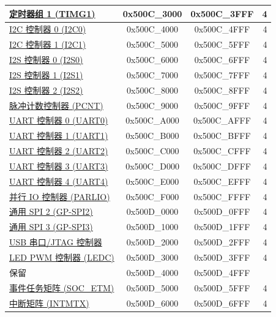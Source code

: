 \begin{ThreePartTable}
\begin{longtable}[c]{ |p{7cm}|c|c|r| }
\hyperref[mod:timg]{定时器组 1 (TIMG1)}        & 0x500C\_3000 & 0x500C\_3FFF &   4 \\\hline
\hyperref[mod:i2c]{I2C 控制器 0 (I2C0)}        & 0x500C\_4000 & 0x500C\_4FFF &   4 \\\hline
\hyperref[mod:i2c]{I2C 控制器 1 (I2C1)}        & 0x500C\_5000 & 0x500C\_5FFF &   4 \\\hline
\hyperref[mod:i2s]{I2S 控制器 0 (I2S0)}        & 0x500C\_6000 & 0x500C\_6FFF &   4 \\\hline
\hyperref[mod:i2s]{I2S 控制器 1 (I2S1)}        & 0x500C\_7000 & 0x500C\_7FFF &   4 \\\hline
\hyperref[mod:i2c]{I2S 控制器 2 (I2S2)}        & 0x500C\_8000 & 0x500C\_8FFF &   4 \\\hline
\hyperref[mod:pcnt]{脉冲计数控制器 (PCNT)} & 0x500C\_9000 & 0x500C\_9FFF &   4 \\\hline
\hyperref[mod:uart]{UART 控制器 0 (UART0)}    & 0x500C\_A000 & 0x500C\_AFFF &   4 \\\hline
\hyperref[mod:uart]{UART 控制器 1 (UART1)}    & 0x500C\_B000 & 0x500C\_BFFF &   4 \\\hline
\hyperref[mod:uart]{UART 控制器 2 (UART2)}     & 0x500C\_C000 & 0x500C\_CFFF &   4 \\\hline
\hyperref[mod:uart]{UART 控制器 3 (UART3)}     & 0x500C\_D000 & 0x500C\_DFFF &   4 \\\hline
\hyperref[mod:uart]{UART 控制器 4 (UART4)}     & 0x500C\_E000 & 0x500C\_EFFF &   4 \\\hline
\hyperref[mod:parlio]{并行 IO 控制器 (PARLIO)}       & 0x500C\_F000 & 0x500C\_FFFF &   4 \\\hline
\hyperref[mod:spi]{通用 SPI 2 (GP-SPI2)} & 0x500D\_0000 & 0x500D\_0FFF &   4 \\\hline
\hyperref[mod:spi]{通用 SPI 3 (GP-SPI3)} & 0x500D\_1000 & 0x500D\_1FFF &   4 \\\hline
\hyperref[mod:usbserialjtag]{USB 串口/JTAG 控制器}       & 0x500D\_2000 & 0x500D\_2FFF &   4 \\\hline
\hyperref[mod:ledpwm]{LED PWM 控制器 (LEDC)}  & 0x500D\_3000 & 0x500D\_3FFF &   4 \\\hline
\rowcolor{gray!25}  保留                      & 0x500D\_4000 & 0x500D\_4FFF &     \\\hline
\hyperref[mod:evntaskmatrix]{事件任务矩阵 (SOC\_ETM)}       & 0x500D\_5000 & 0x500D\_5FFF &   4 \\\hline
\hyperref[mod:intmtrx]{中断矩阵 (INTMTX)} & 0x500D\_6000 & 0x500D\_6FFF &   4 \\\hline

\end{longtable}
\end{ThreePartTable}
